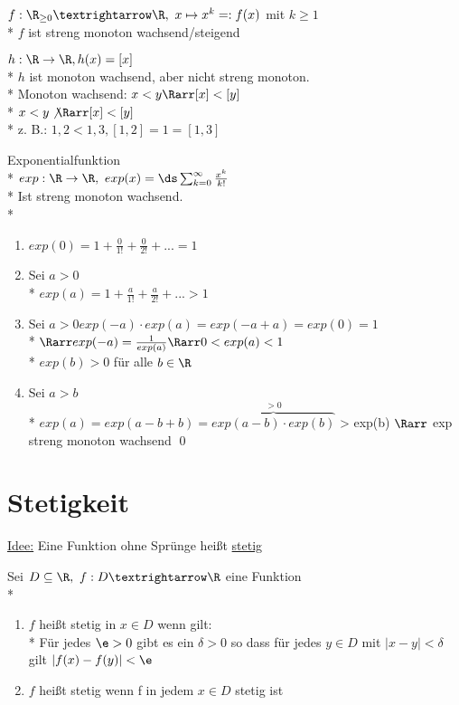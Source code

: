 \begin{enumerate}
\item{$f:\R_{\geq 0}→\R,\ x\mapsto x^k =:f(x)$ mit $k\geq 1$\\*%
$f$ ist streng monoton wachsend/steigend 
\item{$h: \R \to \R, h(x) = [x]$}\\*
$h$ ist monoton wachsend, aber nicht streng monoton.\\*
Monoton wachsend: $x < y \Rarr [x] < [y]$\\*
$x < y \not\Rarr [x] < [y]$\\*
z. B.: $1,2 < 1,3 , [1,2] = 1 = [1,3] $}
\item{Exponentialfunktion\\*
$exp: \R \to \R,\ exp(x)= \ds\sum_{k=0}^{\infty} \frac{x^k}{k!}$\\*
Ist streng monoton wachsend.\\*
\bew
\begin{enumerate}
\item{$exp(0) = 1 + \frac{0}{1!} + \frac{0}{2!} + ... = 1$}
\item{Sei $a > 0$\\*
$exp(a) = 1 + \frac{a}{1!} + \frac{a}{2!} + ... > 1$}
\item{Sei $a > 0 exp(-a) \cdot exp(a) = exp(-a + a) = exp(0) = 1$\\*
$\Rarr exp(-a) = \frac{1}{exp(a)} \Rarr 0 < exp(a) < 1$\\*
$exp(b) > 0$ für alle $b \in \R$}
\item{Sei $a > b$\\*
$exp(a) = exp(a - b + b) = \overbrace{exp(a - b) \cdot exp(b)}^{>0}$
> exp(b) $\Rarr$ exp streng monoton wachsend \qed }
\end{enumerate}
}
\end{enumerate}

\chapter{Stetigkeit}
\ul{Idee:} Eine Funktion ohne Sprünge heißt \ul{stetig}

Sei $D\subseteq \R,\ f:D→\R$ eine Funktion\\*
\begin{enumerate}
\item{$f$ heißt stetig in $x\in D$ wenn gilt:\\*
Für jedes $\e>0$ gibt es ein $\delta>0$ so dass für jedes $y\in D$ mit $|x-y|<\delta$ gilt $|f(x)-f(y)|<\e$ %
}
\item{$f$ heißt stetig wenn f in jedem $x\in D$ stetig ist}
\end{enumerate}

